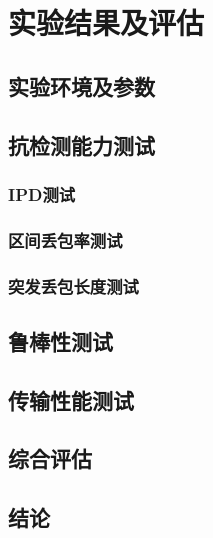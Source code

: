 \section{实验结果及评估}
\label{chap:hash:result}

\subsection{实验环境及参数}
\label{chap:hash:result:parameters}

\subsection{抗检测能力测试}
\label{chap:hash:result:undetectability}

\subsubsection{IPD测试}
\label{chap:hash:result:undetectability:ipd}

\subsubsection{区间丢包率测试}
\label{chap:hash:result:undetectability:plr}

\subsubsection{突发丢包长度测试}
\label{chap:hash:result:undetectability:burst}

\subsection{鲁棒性测试}
\label{chap:hash:result:robustness}

\subsection{传输性能测试}
\label{chap:hash:result:throughput}

\subsection{综合评估}
\label{chap:hash:result:evaluation}

\subsection{结论}
\label{chap:hash:result:conclusion}